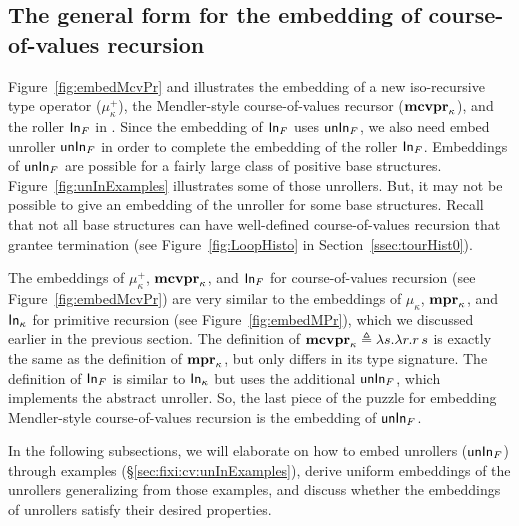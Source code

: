 \subsection{The general form for the embedding of course-of-values recursion}
Figure~\ref{fig:embedMcvPr} and illustrates the embedding of
a new iso-recursive type operator ($\mu^{+}_\kappa$),
the Mendler-style course-of-values recursor ($\mathbf{mcvpr}_\kappa$),
and the roller $\mathsf{In}_F$ in \Fixi. Since the embedding of $\mathsf{In}_F$ uses $\mathsf{unIn}_F$,
we also need embed unroller $\mathsf{unIn}_F$ in order to complete the embedding of
the roller $\mathsf{In}_F$. Embeddings of $\mathsf{unIn}_F$ are possible for a fairly large
class of positive base structures. Figure~\ref{fig:unInExamples} illustrates
some of those unrollers. But, it may not be possible to give an embedding
of the unroller for some base structures. Recall that not all base structures
can have well-defined course-of-values recursion that grantee termination
(see Figure~\ref{fig:LoopHisto} in Section~\ref{ssec:tourHist0}).

The embeddings of $\mu^{+}_\kappa$, $\mathbf{mcvpr}_\kappa$, and $\mathsf{In}_F$
for course-of-values recursion (see Figure~\ref{fig:embedMcvPr}) are
very similar to the embeddings of $\mu_\kappa$, $\mathbf{mpr}_\kappa$, and $\mathsf{In}_\kappa$
for primitive recursion (see Figure~\ref{fig:embedMPr}), which we discussed
earlier in the previous section. The definition of
$\mathbf{mcvpr}_\kappa \triangleq \lambda s.\lambda r.r\,s$ is exactly the same as
the definition of $\mathbf{mpr}_\kappa$, but only differs in its type signature.
The definition of $\mathsf{In}_F$ is similar to $\mathsf{In}_\kappa$ but uses the additional
$\mathsf{unIn}_F$, which implements the abstract unroller. So, the last piece
of the puzzle for embedding Mendler-style course-of-values recursion is
the embedding of $\mathsf{unIn}_F$.

In the following subsections, we will elaborate on how to embed unrollers
($\mathsf{unIn}_F$) through examples (\S\ref{sec:fixi:cv:unInExamples}), derive
uniform embeddings of the unrollers generalizing from those examples, and
discuss whether the embeddings of unrollers satisfy their desired properties.

